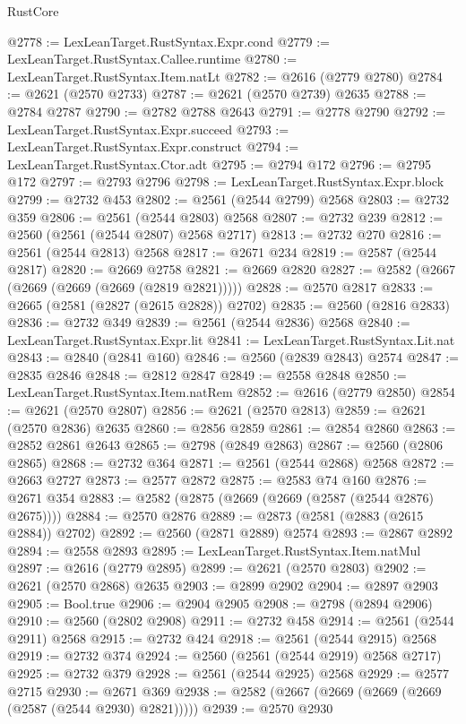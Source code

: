 \begin{lexlean}{RustCore}
\begin{coremodule}
@2778 := LexLeanTarget.RustSyntax.Expr.cond
@2779 := LexLeanTarget.RustSyntax.Callee.runtime
@2780 := LexLeanTarget.RustSyntax.Item.natLt
@2782 := @2616 (@2779 @2780)
@2784 := @2621 (@2570 @2733)
@2787 := @2621 (@2570 @2739) @2635
@2788 := @2784 @2787
@2790 := @2782 @2788 @2643
@2791 := @2778 @2790
@2792 := LexLeanTarget.RustSyntax.Expr.succeed
@2793 := LexLeanTarget.RustSyntax.Expr.construct
@2794 := LexLeanTarget.RustSyntax.Ctor.adt
@2795 := @2794 @172
@2796 := @2795 @172
@2797 := @2793 @2796
@2798 := LexLeanTarget.RustSyntax.Expr.block
@2799 := @2732 @453
@2802 := @2561 (@2544 @2799) @2568
@2803 := @2732 @359
@2806 := @2561 (@2544 @2803) @2568
@2807 := @2732 @239
@2812 := @2560 (@2561 (@2544 @2807) @2568 @2717)
@2813 := @2732 @270
@2816 := @2561 (@2544 @2813) @2568
@2817 := @2671 @234
@2819 := @2587 (@2544 @2817)
@2820 := @2669 @2758
@2821 := @2669 @2820
@2827 := @2582 (@2667 (@2669 (@2669 (@2669 (@2819 @2821)))))
@2828 := @2570 @2817
@2833 := @2665 (@2581 (@2827 (@2615 @2828)) @2702)
@2835 := @2560 (@2816 @2833)
@2836 := @2732 @349
@2839 := @2561 (@2544 @2836) @2568
@2840 := LexLeanTarget.RustSyntax.Expr.lit
@2841 := LexLeanTarget.RustSyntax.Lit.nat
@2843 := @2840 (@2841 @160)
@2846 := @2560 (@2839 @2843) @2574
@2847 := @2835 @2846
@2848 := @2812 @2847
@2849 := @2558 @2848
@2850 := LexLeanTarget.RustSyntax.Item.natRem
@2852 := @2616 (@2779 @2850)
@2854 := @2621 (@2570 @2807)
@2856 := @2621 (@2570 @2813)
@2859 := @2621 (@2570 @2836) @2635
@2860 := @2856 @2859
@2861 := @2854 @2860
@2863 := @2852 @2861 @2643
@2865 := @2798 (@2849 @2863)
@2867 := @2560 (@2806 @2865)
@2868 := @2732 @364
@2871 := @2561 (@2544 @2868) @2568
@2872 := @2663 @2727
@2873 := @2577 @2872
@2875 := @2583 @74 @160
@2876 := @2671 @354
@2883 := @2582 (@2875 (@2669 (@2669 (@2587 (@2544 @2876) @2675))))
@2884 := @2570 @2876
@2889 := @2873 (@2581 (@2883 (@2615 @2884)) @2702)
@2892 := @2560 (@2871 @2889) @2574
@2893 := @2867 @2892
@2894 := @2558 @2893
@2895 := LexLeanTarget.RustSyntax.Item.natMul
@2897 := @2616 (@2779 @2895)
@2899 := @2621 (@2570 @2803)
@2902 := @2621 (@2570 @2868) @2635
@2903 := @2899 @2902
@2904 := @2897 @2903
@2905 := Bool.true
@2906 := @2904 @2905
@2908 := @2798 (@2894 @2906)
@2910 := @2560 (@2802 @2908)
@2911 := @2732 @458
@2914 := @2561 (@2544 @2911) @2568
@2915 := @2732 @424
@2918 := @2561 (@2544 @2915) @2568
@2919 := @2732 @374
@2924 := @2560 (@2561 (@2544 @2919) @2568 @2717)
@2925 := @2732 @379
@2928 := @2561 (@2544 @2925) @2568
@2929 := @2577 @2715
@2930 := @2671 @369
@2938 := @2582 (@2667 (@2669 (@2669 (@2669 (@2587 (@2544 @2930) @2821)))))
@2939 := @2570 @2930

\end{coremodule}
\end{lexlean}

